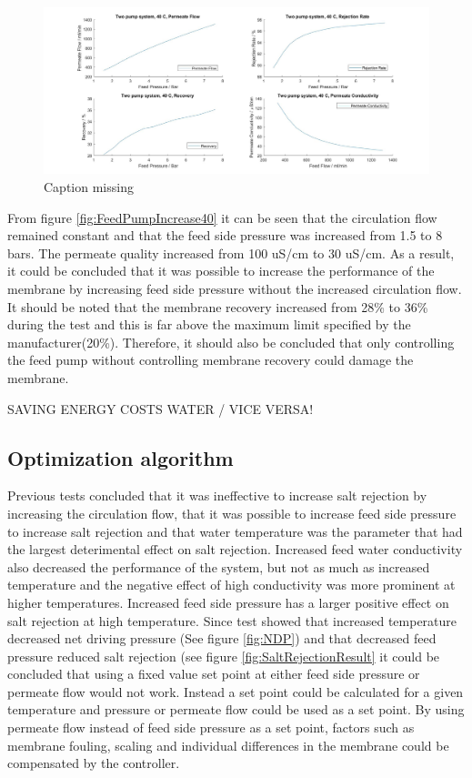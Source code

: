 \begin{figure}[H]
    \centering
    \includegraphics[width=1.1\textwidth]{FeedPumpIncrease40Key}
    \caption{Caption missing}
    \label{fig:FeedPumpIncrease40Key}
\end{figure}

From figure \ref{fig:FeedPumpIncrease40} it can be seen that the circulation flow remained constant and that the feed side pressure was increased from 1.5 to 8 bars. The permeate quality increased from 100 uS/cm to 30 uS/cm. As a result, it could be concluded that it was possible to increase the performance of the membrane by increasing feed side pressure without the increased circulation flow. It should be noted that the membrane recovery increased from 28\% to 36\% during the test and this is far above the maximum limit specified by the manufacturer(20\%). Therefore, it should also be concluded that only controlling the feed pump without controlling membrane recovery could damage the membrane. 

SAVING ENERGY COSTS WATER / VICE VERSA!


 
\newpage
\subsection{Optimization algorithm}

Previous tests concluded that it was ineffective to increase salt rejection by increasing the circulation flow, that it was possible to increase feed side pressure to increase salt rejection and that water temperature was the parameter that had the largest deterimental effect on salt rejection. Increased feed water conductivity also decreased the performance of the system, but not as much as increased temperature and the negative effect of high conductivity was more prominent at higher temperatures. Increased feed side pressure has a larger positive effect on salt rejection at high temperature.
Since test showed that increased temperature decreased net driving pressure (See figure \ref{fig:NDP}) and that decreased feed pressure reduced salt rejection (see figure \ref{fig:SaltRejectionResult} it could be concluded that using a fixed value set point at either feed side pressure or permeate flow would not work. Instead a set point could be calculated for a given temperature and pressure or permeate flow could be used as a set point.
By using permeate flow instead of feed side pressure as a set point, factors such as membrane fouling, scaling and individual differences in the membrane could be compensated by the controller.

